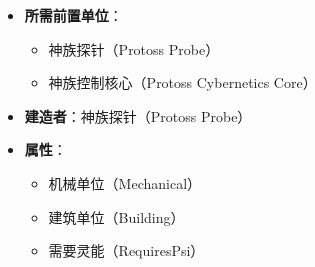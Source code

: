 \begin{tcolorbox}[colback=white, colframe=black!60!white, title=Protoss\_Citadel\_of\_Adun(), arc=0mm]
\begin{itemize}
        \item \textbf{所需前置单位}：
            \begin{itemize}
                \item 神族探针（Protoss Probe）
                \item 神族控制核心（Protoss Cybernetics Core）
            \end{itemize}
        \item \textbf{建造者}：神族探针（Protoss Probe）
        \item \textbf{属性}：
            \begin{itemize}
                \item 机械单位（Mechanical）
                \item 建筑单位（Building）
                \item 需要灵能（RequiresPsi）
            \end{itemize}
    \end{itemize}
\end{tcolorbox}

